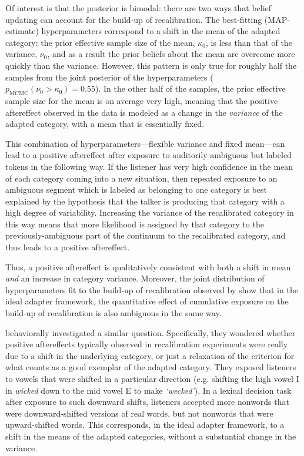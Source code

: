 Of interest is that the posterior is bimodal: there are two ways that belief updating can account for the build-up of recalibration.  The best-fitting (MAP-estimate) hyperparameters correspond to a shift in the mean of the adapted category: the prior effective sample size of the mean, $\kappa_0$, is less than that of the variance, $\nu_0$, and as a result the prior beliefs about the mean are overcome more quickly than the variance.
However, this pattern is only true for roughly half the samples from the joint posterior of the hyperparameters ($p_\mathrm{MCMC}(\nu_0 > \kappa_0) = 0.55$).  In the other half of the samples, the prior effective sample size for the mean is on average very high, meaning that the positive aftereffect observed in the data is modeled as a change in the \emph{variance} of the adapted category, with a mean that is essentially fixed.

This combination of hyperparameters---flexible variance and fixed mean---can lead to a positive aftereffect after exposure to auditorily ambiguous but labeled tokens in the following way.  If the listener has very high confidence in the mean of each category coming into a new situation, then repeated exposure to an ambiguous segment which is labeled as belonging to one category is best explained by the hypothesis that the talker is producing that category with a high degree of variability.  Increasing the variance of the recalibrated category in this way means that more likelihood is assigned by that category to the previously-ambiguous part of the continuum to the recalibrated category, and thus leads to a positive aftereffect.

Thus, a positive aftereffect is qualitatively consistent with both a shift in mean \emph{and} an increase in category variance.  Moreover, the joint distribution of hyperparameters fit to the build-up of recalibration observed by  show that in the ideal adapter framework, the quantitative effect of cumulative exposure on the build-up of recalibration is also ambiguous in the same way.

 behaviorally investigated a similar question.  Specifically, they wondered whether positive aftereffects typically observed in recalibration experiments were really due to a shift in the underlying category, or just a relaxation of the criterion for what counts as a good exemplar of the adapted category.  They exposed listeners to vowels that were shifted in a particular direction (e.g. shifting the high vowel \ph I in \emph{wicked} down to the mid vowel \ph E to make \emph{`wecked'}).  In a lexical decision task after exposure to such downward shifts, listeners accepted more nonwords that were downward-shifted versions of real words, but not nonwords that were upward-shifted words.  This corresponds, in the ideal adapter framework, to a shift in the means of the adapted categories, without a substantial change in the variance.

